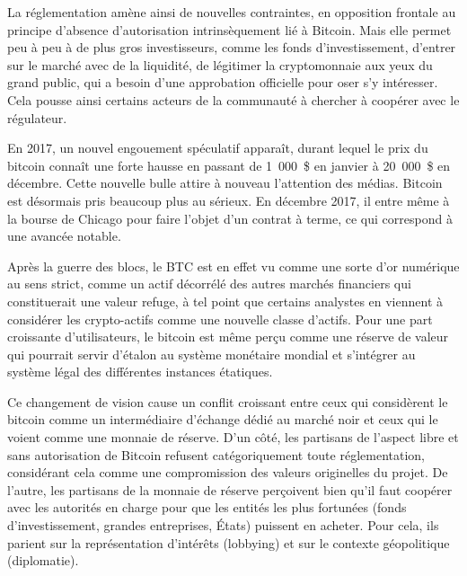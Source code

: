 La réglementation amène ainsi de nouvelles contraintes, en opposition frontale au principe d'absence d'autorisation intrinsèquement lié à Bitcoin. Mais elle permet peu à peu à de plus gros investisseurs, comme les fonds d'investissement, d'entrer sur le marché avec de la liquidité, de légitimer la cryptomonnaie aux yeux du grand public, qui a besoin d'une approbation officielle pour oser s'y intéresser. Cela pousse ainsi certains acteurs de la communauté à chercher à coopérer avec le régulateur. %

En 2017, un nouvel engouement spéculatif apparaît, durant lequel le prix du bitcoin connaît une forte hausse en passant de 1~000~\$ en janvier à 20~000~\$ en décembre. Cette nouvelle bulle attire à nouveau l'attention des médias. Bitcoin est désormais pris beaucoup plus au sérieux. En décembre 2017, il entre même à la bourse de Chicago pour faire l'objet d'un contrat à terme, ce qui correspond à une avancée notable.

Après la guerre des blocs, le BTC est en effet vu comme une sorte d'or numérique au sens strict, comme un actif décorrélé des autres marchés financiers qui constituerait une valeur refuge, à tel point que certains analystes en viennent à considérer les crypto-actifs comme une nouvelle classe d'actifs. Pour une part croissante d'utilisateurs, le bitcoin est même perçu comme une réserve de valeur qui pourrait servir d'étalon au système monétaire mondial et s'intégrer au système légal des différentes instances étatiques.

Ce changement de vision cause un conflit croissant entre ceux qui considèrent le bitcoin comme un intermédiaire d'échange dédié au marché noir et ceux qui le voient comme une monnaie de réserve. D'un côté, les partisans de l'aspect libre et sans autorisation de Bitcoin refusent catégoriquement toute réglementation, considérant cela comme une compromission des valeurs originelles du projet. De l'autre, les partisans de la monnaie de réserve perçoivent bien qu'il faut coopérer avec les autorités en charge pour que les entités les plus fortunées (fonds d'investissement, grandes entreprises, États) puissent en acheter. Pour cela, ils parient sur la représentation d'intérêts (lobbying) et sur le contexte géopolitique (diplomatie).

